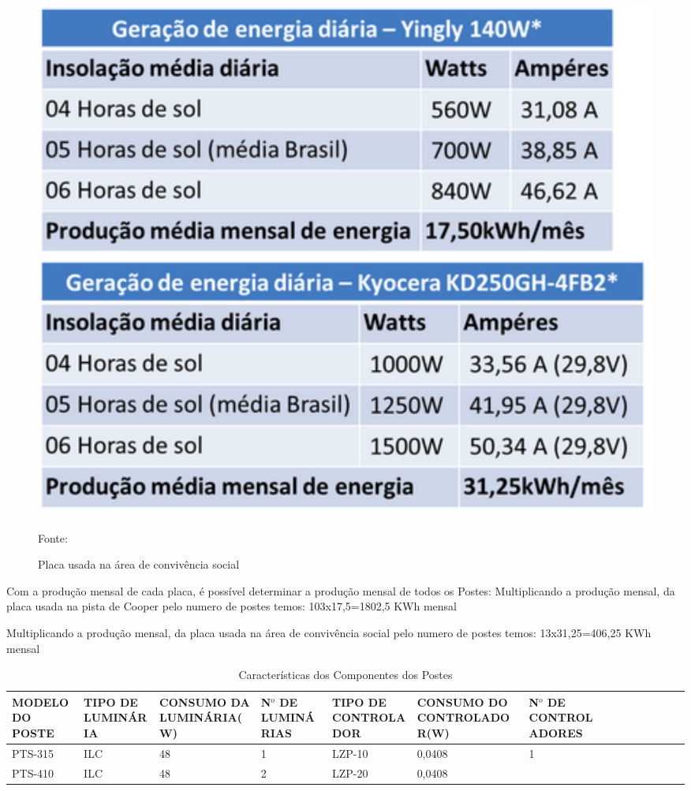 \begin{figure}[H]
	\centering
	\label{PlacaConvivenciaSocial}
		\includegraphics[keepaspectratio=true,scale=0.9]{figuras/PlacaConvivenciaSocial.png}
	\caption{Placa usada na  \'area de conviv\^encia social}
	\small{Fonte: \cite{NEOSOLARCASASOLAR} }
\end{figure}
	
	Com a produ\c{c}\~ao mensal de cada placa, \'e poss\'ivel determinar a produ\c{c}\~ao mensal de todos os Postes:
Multiplicando a produ\c{c}\~ao mensal, da placa usada na pista de Cooper pelo numero de postes temos:
103x17,5=1802,5 KWh mensal

Multiplicando a produ\c{c}\~ao mensal, da placa usada na \'area de conviv\^encia social pelo numero de postes temos:
13x31,25=406,25 KWh mensal

\begin{table}[H]
\caption{Caracter\'isticas dos Componentes dos Postes} 
\label{ComponentesDosPostes}
\begin{center}
\begin{tabular}{|p{1cm}lp{1cm}lp{1cm}lp{1cm}lp{1cm}lp{1cm}lp{1cm}l} \hline

MODELO DO POSTE &TIPO DE LUMIN\'ARIA &CONSUMO DA LUMIN\'ARIA(W) &N$^{o}$ DE LUMIN\'ARIAS &TIPO DE CONTROLADOR &CONSUMO DO CONTROLADOR(W) &N$^{o}$ DE CONTROLADORES\\ \hline 

PTS-315         & ILC               & 48                      & 1                & LZP-10              & 0,0408                    & 1                   \\ \hline
PTS-410         & ILC               & 48                      & 2                & LZP-20              & 0,0408                    & \\ \hline  

 \end{tabular}
\end{center}
\end{table}

